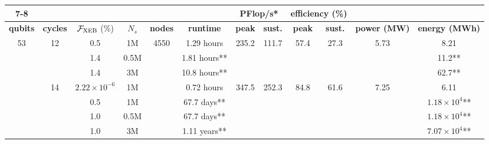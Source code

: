 \begin{table}
\centering
\begin{tabular}{|c|c|c|c|c|c|c|c|c|c|c|c|}
\cline{7-8} \cline{9-10}
\multicolumn{1}{c}{} & \multicolumn{1}{c}{} & \multicolumn{1}{c}{} & \multicolumn{1}{c}{} & \multicolumn{1}{c}{} &  & \multicolumn{2}{c|}{\textbf{PFlop/s*}} & \multicolumn{2}{c|}{\textbf{efficiency (\%)}} & \multicolumn{1}{c}{} & \multicolumn{1}{c}{}\tabularnewline
\hline 
\textbf{qubits} & \textbf{cycles} & \textbf{$\mathcal{F}_{\text{XEB}}$} (\%) & \textbf{$N_s$} & \textbf{nodes} & \textbf{runtime} & \textbf{peak} & \textbf{sust.} & \textbf{peak} & \textbf{sust.} & \textbf{power (MW)} & \textbf{energy (MWh)}\tabularnewline

\hline 
\hline 
\multirow{7}{*}{53} & \multirow{3}{*}{12} & 0.5 & 1M & \multirow{7}{*}{4550} & 1.29 hours & \multirow{3}{*}{235.2} & \multirow{3}{*}{111.7} & \multirow{3}{*}{57.4} & \multirow{3}{*}{27.3} & \multirow{3}{*}{5.73} & 8.21 \tabularnewline
\cline{3-4} \cline{6-6} \cline{12-12}
 &  & 1.4 & 0.5M &  & 1.81 hours** &  &  &  &  &  & 11.2** \tabularnewline
\cline{3-4} \cline{6-6} \cline{12-12}
 &  & 1.4 & 3M &  & 10.8 hours** &  &  &  &  &  & 62.7** \tabularnewline
\cline{2-2} \cline{3-4} \cline{6-6} \cline{7-11} \cline{12-12}
 & \multirow{4}{*}{14} & $2.22\times 10^{-6}$ & 1M &  & 0.72 hours & \multirow{4}{*}{347.5} & \multirow{4}{*}{252.3} & \multirow{4}{*}{84.8} & \multirow{4}{*}{61.6} & \multirow{4}{*}{7.25} & 6.11 \tabularnewline
\cline{3-4} \cline{6-6} \cline{12-12}
 &  & 0.5 & 1M &  & 67.7 days** &  &  &  &  &  & $1.18 \times 10^{4}$** \tabularnewline
\cline{3-4} \cline{6-6} \cline{12-12}
 &  & 1.0 & 0.5M &  & 67.7 days** &  &  &  &  &  & $1.18 \times 10^{4}$** \tabularnewline
\cline{3-4} \cline{6-6} \cline{12-12}
 &  & 1.0 & 3M &  & 1.11 years** &  &  &  &  &  & $7.07 \times 10^{4}$** \tabularnewline
\hline 
\end{tabular}

\end{table}
